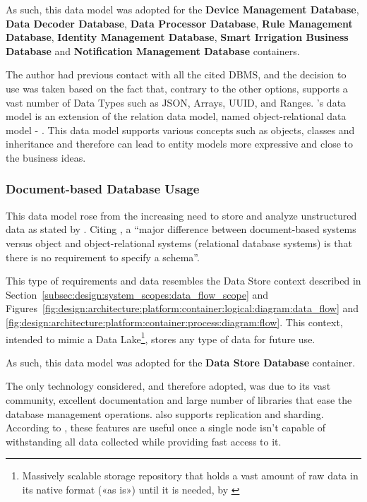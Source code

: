 As such, this data model was adopted for the \textbf{Device Management Database}, \textbf{Data Decoder Database}, \textbf{Data Processor Database}, \textbf{Rule Management Database}, \textbf{Identity Management Database}, \textbf{Smart Irrigation Business Database} and \textbf{Notification Management Database} containers.

The author had previous contact with all the cited \gls{DBMS}, and the decision to use  was taken based on the fact that, contrary to the other options,  supports a vast number of Data Types such as \gls{JSON}, Arrays, \gls{UUID}, and Ranges. 's data model is an extension of the relation data model, named object-relational data model - \cite{elmasri2000fundamentals}. This data model supports various concepts such as objects, classes and inheritance and therefore can lead to entity models more expressive and close to the business ideas.

\subsubsection{Document-based Database Usage}
\label{subsubsec:implementation:decisions:database:nosql}

This data model rose from the increasing need to store and analyze unstructured data as stated by \cite{miloslavskaya2016big}.  Citing \cite{elmasri2000fundamentals}, a ``major difference between document-based systems versus object and object-relational systems (relational database systems) is that there is no requirement to specify a schema''.

This type of requirements and data resembles the Data Store context described in Section~\ref{subsec:design:system_scopes:data_flow_scope} and Figures~\ref{fig:design:architecture:platform:container:logical:diagram:data_flow} and \ref{fig:design:architecture:platform:container:process:diagram:flow}. This context, intended to mimic a Data Lake\footnote{Massively scalable storage repository that holds a vast amount of raw data in its native format («as is») until it is needed, by \cite{miloslavskaya2016big}}, stores any type of data for future use.

As such, this data model was adopted for the \textbf{Data Store Database} container.

The only technology considered, and therefore adopted, was  due to its vast community, excellent documentation and large number of libraries that ease the database management operations.  also supports replication and sharding. According to \cite{elmasri2000fundamentals}, these features are useful once a single node isn't capable of withstanding all data collected while providing fast access to it.

